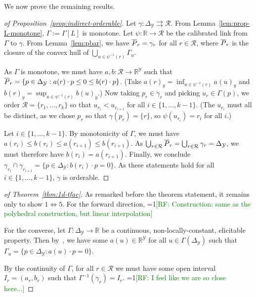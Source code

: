 \documentclass[anon,12pt]{colt2019}
\newcommand{\Comments}{1}
\newcommand{\mynote}[2]{\ifnum\Comments=1\textcolor{#1}{#2}\fi}
\newcommand{\raf}[1]{\mynote{green}{[RF: #1]}}
\newcommand{\reals}{\mathbb{R}}
\newcommand{\prop}[1]{\Gamma[#1]}
\newcommand{\simplex}{\Delta_\Y}
\newcommand{\R}{\mathcal{R}}
\newcommand{\Y}{\mathcal{Y}}
\newcommand{\inter}[1]{\mathring{#1}}%
\newcommand{\toto}{\rightrightarrows}
\begin{document}
We now prove the remaining results.
\begin{proof}[of Proposition~\ref{prop:indirect-orderable}]
  Let $\gamma:\simplex\toto\R$.
  From Lemma~\ref{lem:prop-L-monotone}, $\Gamma := \prop{L}$ is monotone.
  Let $\psi:\reals\to\R$ be the calibrated link from $\Gamma$ to $\gamma$.
  From Lemma~\ref{lem:pbar}, we have $\overline P_r = \gamma_r$ for all $r\in\R$, where $\overline P_r$ is the closure of the convex hull of $\bigcup_{u\in\psi^{-1}(r)} \Gamma_u$.

  As $\Gamma$ is monotone, we must have $a,b : \R\to\reals^\Y$ such that $\Pbar_r = \{p\in\simplex : a(r) \cdot p \leq 0 \leq b(r) \cdot p\}$.
  (Take $a(r)_y = \inf_{u\in\psi^{-1}(r)} a(u)_y$ and $b(r)_y = \sup_{u\in\psi^{-1}(r)} b(u)_y$.)
  Now taking $p_r\in\inter\gamma_r$ and picking $u_r \in \Gamma(p)$, we order $\R = \{r_1,\ldots,r_k\}$ so that $u_{r_i} < u_{r_{i+1}}$ for all $i\in\{1,\ldots,k-1\}$.
  (The $u_{r_i}$ must all be distinct, as we chose $p_r$ so that $\gamma(p_r) = \{r\}$, so $\psi(u_{r_i}) = r_i$ for all $i$.)

  Let $i\in\{1,\ldots,k-1\}$.
  By monotonicity of $\Gamma$, we must have $a(r_i) \leq b(r_i) \leq a(r_{i+1}) \leq b(r_{i+1})$.
  As $\bigcup_{r\in\R} \Pbar_r = \bigcup_{r\in\R} \gamma_r = \simplex$, we must therefore have $b(r_i) = a(r_{i+1})$.
  Finally, we conclude $\gamma_{r_i} \cap \gamma_{r_{i+1}} = \{p\in\simplex : b(r_i) \cdot p = 0\}$.
  As these statements hold for all $i\in\{1,\ldots,k-1\}$, $\gamma$ is orderable.
\end{proof}

\begin{proof}[of Theorem~\ref{thm:1d-tfae}]
  As remarked before the theorem statement, it remains only to show $1 \iff 5$.
  For the forward direction,
  \raf{Construction: same as the polyhedral construction, but linear interpolation}

  For the converse, let $\Gamma:\simplex\to\reals$ be a continuous, non-locally-constant, elicitable property.
  Then by~\cite{lambert2018elicitation,steinwart2014elicitation}, we have some $a(u)\in\reals^\Y$ for all $u\in\Gamma(\simplex)$ such that $\Gamma_u = \{p\in\simplex : a(u) \cdot p = 0\}$.

  By the continuity of $\Gamma$, for all $r\in\R$ we must have some open interval $I_r = (a_r,b_r)$ such that $\Gamma^{-1}(\inter\gamma_r) = I_r$.
  \raf{I feel like we are so close here...}

\end{proof}
\end{document}
